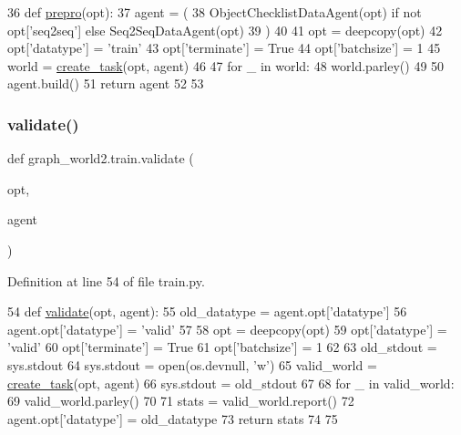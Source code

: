 \begin{DoxyCode}
36 \textcolor{keyword}{def }\hyperlink{namespacegraph__world2_1_1train_ac238655ccbc748146d1cbaaac96433a5}{prepro}(opt):
37     agent = (
38         ObjectChecklistDataAgent(opt) \textcolor{keywordflow}{if} \textcolor{keywordflow}{not} opt[\textcolor{stringliteral}{'seq2seq'}] \textcolor{keywordflow}{else} Seq2SeqDataAgent(opt)
39     )
40 
41     opt = deepcopy(opt)
42     opt[\textcolor{stringliteral}{'datatype'}] = \textcolor{stringliteral}{'train'}
43     opt[\textcolor{stringliteral}{'terminate'}] = \textcolor{keyword}{True}
44     opt[\textcolor{stringliteral}{'batchsize'}] = 1
45     world = \hyperlink{namespaceparlai_1_1core_1_1worlds_a79969c7ba76d4b3c500f5bb776444dc6}{create\_task}(opt, agent)
46 
47     \textcolor{keywordflow}{for} \_ \textcolor{keywordflow}{in} world:
48         world.parley()
49 
50     agent.build()
51     \textcolor{keywordflow}{return} agent
52 
53 
\end{DoxyCode}
\mbox{\label{namespacegraph__world2_1_1train_aa00e41e1619128901ea053170fedef0b}} 
\subsubsection{\texorpdfstring{validate()}{validate()}}
{\footnotesize\ttfamily def graph\+\_\+world2.\+train.\+validate (\begin{DoxyParamCaption}\item[{}]{opt,  }\item[{}]{agent }\end{DoxyParamCaption})}



Definition at line 54 of file train.\+py.


\begin{DoxyCode}
54 \textcolor{keyword}{def }\hyperlink{namespacegraph__world2_1_1train_aa00e41e1619128901ea053170fedef0b}{validate}(opt, agent):
55     old\_datatype = agent.opt[\textcolor{stringliteral}{'datatype'}]
56     agent.opt[\textcolor{stringliteral}{'datatype'}] = \textcolor{stringliteral}{'valid'}
57 
58     opt = deepcopy(opt)
59     opt[\textcolor{stringliteral}{'datatype'}] = \textcolor{stringliteral}{'valid'}
60     opt[\textcolor{stringliteral}{'terminate'}] = \textcolor{keyword}{True}
61     opt[\textcolor{stringliteral}{'batchsize'}] = 1
62 
63     old\_stdout = sys.stdout
64     sys.stdout = open(os.devnull, \textcolor{stringliteral}{'w'})
65     valid\_world = \hyperlink{namespaceparlai_1_1core_1_1worlds_a79969c7ba76d4b3c500f5bb776444dc6}{create\_task}(opt, agent)
66     sys.stdout = old\_stdout
67 
68     \textcolor{keywordflow}{for} \_ \textcolor{keywordflow}{in} valid\_world:
69         valid\_world.parley()
70 
71     stats = valid\_world.report()
72     agent.opt[\textcolor{stringliteral}{'datatype'}] = old\_datatype
73     \textcolor{keywordflow}{return} stats
74 
75 
\end{DoxyCode}


